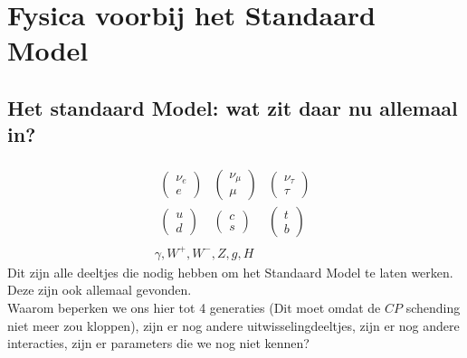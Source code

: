 \documentclass[../main.tex]{subfiles}
\begin{document}
\section{Fysica voorbij het Standaard Model}%
\label{sec:fysica_voorbij_het_standaard_model}

\subsection{Het standaard Model: wat zit daar nu allemaal in?}%
\label{sub:het_standaard_model_wat_zit_daar_nu_allemaal_in_}

\begin{equation}
    \begin{aligned}
        \label{eq:standaard_model}
            \begin{array}{ccc}
                \left(\begin{array}{c}
                        \nu_{e} \\
                        e
                        \end{array}\right) & \left(\begin{array}{c}
                        \nu_{\mu} \\
                        \mu
                        \end{array}\right) & \left(\begin{array}{c}
                        \nu_{\tau} \\
                        \tau
                \end{array}\right) \\
                \left(\begin{array}{l}
                        u \\
                        d
                        \end{array}\right) & \left(\begin{array}{l}
                        c \\
                        s
                        \end{array}\right) & \left(\begin{array}{l}
                        t \\
                        b
                \end{array}\right)
            \end{array}\\
            \gamma, W^{+}, W^{-}, Z, g, H
    \end{aligned}
\end{equation}
Dit zijn alle deeltjes die nodig hebben om het Standaard Model te laten werken. Deze zijn ook allemaal gevonden.\\
Waarom beperken we ons hier tot 4 generaties (Dit moet omdat de $CP$ schending niet meer zou kloppen), zijn er nog andere uitwisselingdeeltjes, zijn er nog andere interacties, zijn er parameters die we nog niet kennen?
\end{document}
